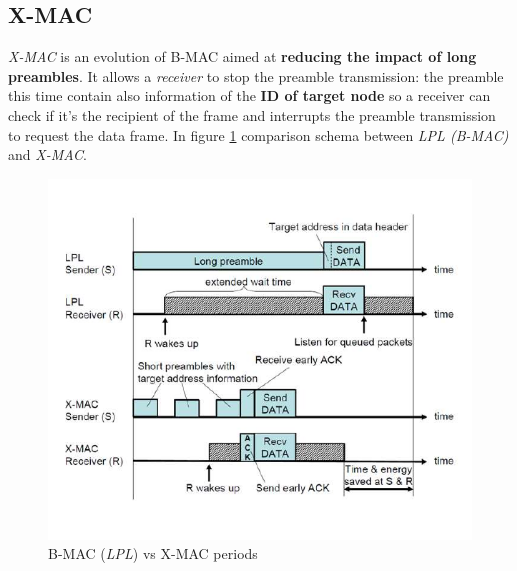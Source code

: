 \documentclass[10pt,a4paper]{report}
\theoremstyle{definition}
\begin{document}
\subsection{X-MAC}\label{sec:x-mac}
\textit{X-MAC} is an evolution of B-MAC aimed at \textbf{reducing the impact of long preambles}.
It allows a \textit{receiver} to stop the preamble transmission: the preamble this time contain also information of the \textbf{ID of target node} so a receiver can check if it's the recipient of the frame and interrupts the preamble transmission to request the data frame.
In figure \ref{xmac-schema} comparison schema between \textit{LPL (B-MAC)} and \textit{X-MAC}.
\begin{figure}[h!]
	\centering\includegraphics[scale=0.60]{images/Pasted image 20230409090007.png}
	\caption{B-MAC (\textit{LPL}) vs X-MAC periods}
	\label{xmac-schema}
\end{figure}
\end{document}
